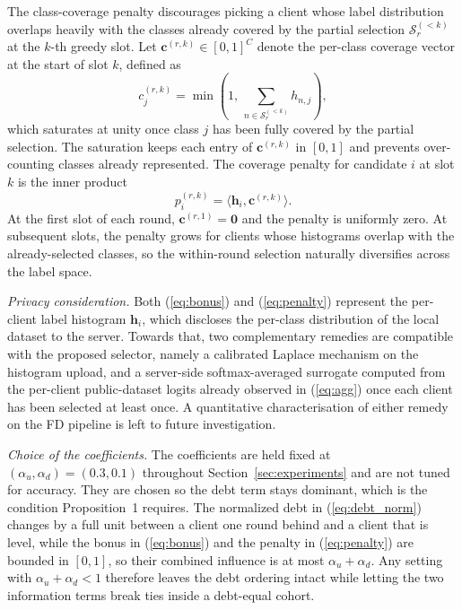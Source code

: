 \documentclass[journal]{IEEEtran}
\newcommand{\new}[1]{#1}
\newcommand{\rev}[1]{{\color{blue}#1}}
\begin{document}
The class-coverage penalty discourages picking a client whose label distribution overlaps heavily with the classes already covered by the partial selection $\mathcal{S}_r^{(<k)}$ at the $k$-th greedy slot. Let $\bm{c}^{(r,k)} \in [0,1]^{C}$ denote the per-class coverage vector at the start of slot $k$, defined as
\begin{equation}
c_{j}^{(r,k)} = \min\!\left(1,\, \sum_{n \in \mathcal{S}_r^{(<k)}} h_{n,j}\right),
\label{eq:cov}
\end{equation}
which saturates at unity once class $j$ has been fully covered by the partial selection. The saturation keeps each entry of $\bm{c}^{(r,k)}$ in $[0,1]$ and prevents over-counting classes already represented. The coverage penalty for candidate $i$ at slot $k$ is the inner product
\begin{equation}
p_i^{(r,k)} = \langle \bm{h}_i, \bm{c}^{(r,k)} \rangle.
\label{eq:penalty}
\end{equation}
At the first slot of each round, $\bm{c}^{(r,1)} = \bm{0}$ and the penalty is uniformly zero. At subsequent slots, the penalty grows for clients whose histograms overlap with the already-selected classes, so the within-round selection naturally diversifies across the label space.

\new{\textit{Privacy consideration.} Both (\ref{eq:bonus}) and (\ref{eq:penalty}) represent the per-client label histogram $\bm{h}_i$, which discloses the per-class distribution of the local dataset to the server. Towards that, two complementary remedies are compatible with the proposed selector, namely a calibrated Laplace mechanism on the histogram upload, and a server-side softmax-averaged surrogate computed from the per-client public-dataset logits already observed in (\ref{eq:agg}) once each client has been selected at least once. A quantitative characterisation of either remedy on the FD pipeline is left to future investigation.}

\rev{\textit{Choice of the coefficients.} The coefficients are held fixed at $(\alpha_u, \alpha_d) = (0.3, 0.1)$ throughout Section~\ref{sec:experiments} and are not tuned for accuracy. They are chosen so the debt term stays dominant, which is the condition Proposition~1 requires. The normalized debt in (\ref{eq:debt_norm}) changes by a full unit between a client one round behind and a client that is level, while the bonus in (\ref{eq:bonus}) and the penalty in (\ref{eq:penalty}) are bounded in $[0,1]$, so their combined influence is at most $\alpha_u + \alpha_d$. Any setting with $\alpha_u + \alpha_d < 1$ therefore leaves the debt ordering intact while letting the two information terms break ties inside a debt-equal cohort.}
\end{document}
